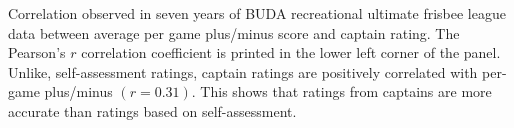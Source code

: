Correlation observed in seven years of BUDA recreational ultimate frisbee league data between average per game plus/minus score and captain rating.  The Pearson's $r$ correlation coefficient is printed in the lower left corner of the panel. Unlike, self-assessment ratings, captain ratings are positively correlated with per-game plus/minus $(r = 0.31)$. This shows that ratings from captains are more accurate than ratings based on self-assessment.